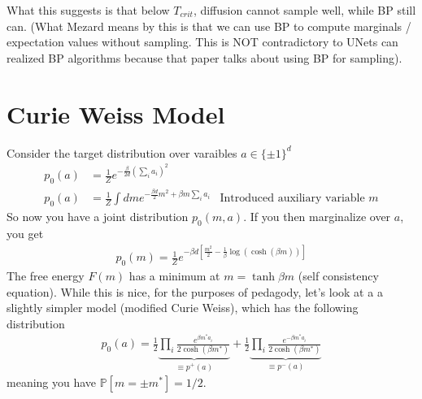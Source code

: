 What this suggests is that below $T_{crit}$, diffusion cannot sample well, while BP still can. (What Mezard means by this is that we can use BP to compute marginals / expectation values without sampling. This is NOT contradictory to UNets can realized BP algorithms because that paper talks about using BP for sampling).

\section{Curie Weiss Model}
Consider the target distribution over varaibles $a \in \{\pm 1\}^d$
\begin{align}
	p_0(a) & = \frac{1}{Z} e^{-\frac{\beta}{2d}(\sum_i a_i)^2} \\
	p_0(a)& = \frac{1}{Z} \int dm e^{- \frac{\beta d}{2} m^2 + \beta m \sum_i a_i} & \text{Introduced auxiliary variable } m
\end{align}
So now you have a joint distribution $p_0(m, a)$. If you then marginalize over $a$, you get
\begin{align}
	p_0(m) =\frac{1}{Z} e^{- \beta d [ \frac{m^2}{2} - \frac{1}{\beta} \log (\cosh(\beta m))]}
\end{align}
The free energy $F(m)$ has a minimum at $m = \tanh \beta m$ (self consistency equation). While this is nice, for the purposes of pedagody, let's look at a a slightly simpler model (modified Curie Weiss), which has the following distribution
\begin{align}
	p_0(a) = \frac{1}{2} \underbrace{\prod_i \frac{e^{\beta m^* a_i}}{2 \cosh(\beta m^*)}}_{\equiv p^+(a)} + \frac{1}{2} \underbrace{\prod_i \frac{e^{- \beta m^* a_i}}{2 \cosh (\beta m^*)}}_{\equiv p^-(a)}
\end{align} 
meaning you have $\mathbb P[m= \pm m^*] = 1/2$.

